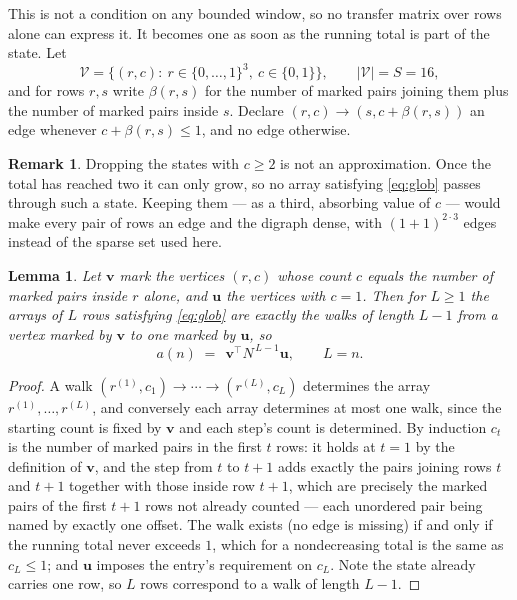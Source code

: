 \documentclass[11pt,a4paper]{article}
\theoremstyle{plain}
\newtheorem{lemma}[theorem]{Lemma}
\theoremstyle{definition}
\newtheorem{remark}[theorem]{Remark}
\begin{document}
This is not a condition on any bounded window, so no transfer matrix over rows alone can
express it. It becomes one as soon as the running total is part of the state. Let
\[
\mathcal V=\bigl\{(r,c):\ r\in\{0,\dots,1\}^{3},\ c\in\{0,1\}\bigr\},
\qquad |\mathcal V|=S=16,
\]
and for rows $r,s$ write $\beta(r,s)$ for the number of marked pairs joining them plus the
number of marked pairs inside $s$. Declare $(r,c)\to(s,c+\beta(r,s))$ an edge whenever
$c+\beta(r,s)\le1$, and no edge otherwise.

\begin{remark}
Dropping the states with $c\ge2$ is not an approximation. Once the total has reached two it
can only grow, so no array satisfying \eqref{eq:glob} passes through such a state. Keeping
them --- as a third, absorbing value of $c$ --- would make every pair of rows an edge and
the digraph dense, with $(1+1)^{2\cdot3}$ edges instead of the sparse set used here.
\end{remark}

\begin{lemma}\label{lem:walk}
Let $\mathbf{v}$ mark the vertices $(r,c)$ whose count $c$ equals the number of marked pairs
inside $r$ alone, and $\mathbf{u}$ the vertices with $c=1$. Then for $L\ge1$ the arrays
of $L$ rows satisfying \eqref{eq:glob} are exactly the walks of length $L-1$ from a
vertex marked by $\mathbf{v}$ to one marked by $\mathbf{u}$, so
\[
a(n)\;=\;\,\mathbf{v}^{\!\top}N^{\,L-1}\mathbf{u},\qquad L=n .
\]
\end{lemma}

\begin{proof}
A walk $(r^{(1)},c_1)\to\cdots\to(r^{(L)},c_L)$ determines the array
$r^{(1)},\dots,r^{(L)}$, and conversely each array determines at most one walk, since the
starting count is fixed by $\mathbf{v}$ and each step's count is determined. By induction
$c_t$ is the number of marked pairs in the first $t$ rows: it holds at $t=1$ by the
definition of $\mathbf{v}$, and the step from $t$ to $t+1$ adds exactly the pairs joining
rows $t$ and $t+1$ together with those inside row $t+1$, which are precisely the marked
pairs of the first $t+1$ rows not already counted --- each unordered pair being named by
exactly one offset. The walk exists (no edge is missing) if and only if the running total
never exceeds $1$, which for a nondecreasing total is the same as $c_L\le1$; and
$\mathbf{u}$ imposes the entry's requirement on $c_L$. Note the state already carries one
row, so $L$ rows correspond to a walk of length $L-1$.
\end{proof}
\end{document}
